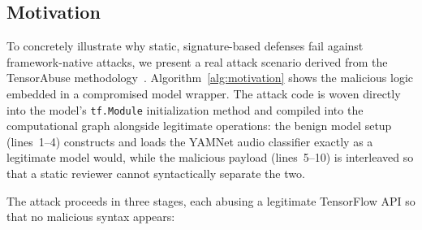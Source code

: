 \subsection{Motivation}
\label{sec:motivation}

To concretely illustrate why static, signature-based defenses fail against framework-native attacks, we present a real attack scenario derived from the TensorAbuse methodology~\cite{zhu2025}. Algorithm~\ref{alg:motivation} shows the malicious logic embedded in a compromised model wrapper. The attack code is woven directly into the model's \texttt{tf.Module} initialization method and compiled into the computational graph alongside legitimate operations: the benign model setup (lines~1--4) constructs and loads the YAMNet audio classifier exactly as a legitimate model would, while the malicious payload (lines~5--10) is interleaved so that a static reviewer cannot syntactically separate the two.

\begin{algorithm}[t!]
\caption{Framework-Native File Exfiltration Attack}
\label{alg:motivation}


\end{algorithm}

The attack proceeds in three stages, each abusing a legitimate TensorFlow API so that no malicious syntax appears:

